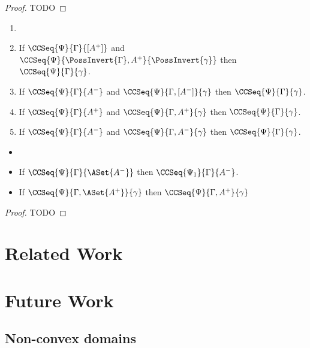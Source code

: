 \begin{proof}
TODO
\end{proof}

\begin{theorem}
  \newcommand{\GammaF}{\PossFocus{\Gamma}}
  \newcommand{\GammaI}{\PossInvert{\Gamma}}
  \newcommand{\gammaF}{\PossFocus{\gamma}}
  \newcommand{\gammaI}{\PossInvert{\gamma}}
  \begin{enumerate}
  \item[]
  \item If $\CCSeq{\Psi}{\Gamma
    }{[A^+]}$ and $\CCSeq{\Psi}{\GammaI,A^+}{\gammaI}$
    then $\CCSeq{\Psi}{\Gamma}{\gamma}$.
  \item If $\CCSeq{\Psi}{\Gamma}{A^-}$ and $\CCSeq{\Psi}{\Gamma,[A^-]}{\gamma}$
    then $\CCSeq{\Psi}{\Gamma}{\gamma}$.
  \item If $\CCSeq{\Psi}{\Gamma}{A^+}$ and $\CCSeq{\Psi}{\Gamma,A^+}{\gamma}$
    then $\CCSeq{\Psi}{\Gamma}{\gamma}$.
  \item If $\CCSeq{\Psi}{\Gamma}{A^-}$ and $\CCSeq{\Psi}{\Gamma,A^-}{\gamma}$
    then $\CCSeq{\Psi}{\Gamma}{\gamma}$.
  \end{enumerate}
\end{theorem}

\begin{theorem}
  \begin{itemize}
  \item[]
  \item If $\CCSeq{\Psi}{\Gamma}{\ASet{A^-}}$ then $\CCSeq{\Psi_1}{\Gamma}{A^-}$.
  \item If $\CCSeq{\Psi}{\Gamma, \ASet{A^+}}{\gamma}$ then
    $\CCSeq{\Psi}{\Gamma,A^+}{\gamma}$
  \end{itemize}
\end{theorem}

\begin{proof}
TODO
\end{proof}

\section{Related Work}

\section{Future Work}


\subsection{Non-convex domains}

